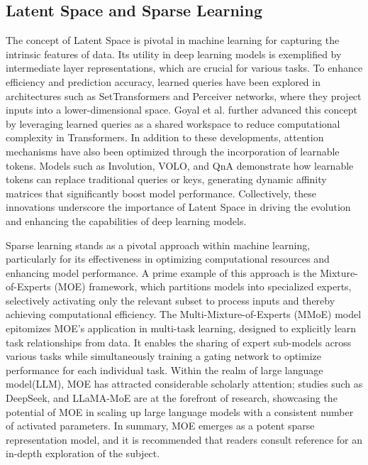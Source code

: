 \subsection{Latent Space and Sparse Learning}
The concept of Latent Space is pivotal in machine learning for capturing the intrinsic features of data. Its utility in deep learning models is exemplified by intermediate layer representations, which are crucial for various tasks\cite{goyal2021coordination}. To enhance efficiency and prediction accuracy, learned queries have been explored in architectures such as SetTransformers\cite{Settransformer} and Perceiver \cite{Perceiver} networks, where they project inputs into a lower-dimensional space. Goyal et al.\cite{goyal2021coordination} further advanced this concept by leveraging learned queries as a shared workspace to reduce computational complexity in Transformers. In addition to these developments, attention mechanisms have also been optimized through the incorporation of learnable tokens. Models such as Involution\cite{Involution}, VOLO\cite{Volo}, and QnA\cite{Learnedqueries} demonstrate how learnable tokens can replace traditional queries or keys, generating dynamic affinity matrices that significantly boost model performance. Collectively, these innovations underscore the importance of Latent Space in driving the evolution and enhancing the capabilities of deep learning models.

Sparse learning stands as a pivotal approach within machine learning, particularly for its effectiveness in optimizing computational resources and enhancing model performance. A prime example of this approach is the Mixture-of-Experts (MOE) framework, which partitions models into specialized experts, selectively activating only the relevant subset to process inputs and thereby achieving computational efficiency. The Multi-Mixture-of-Experts (MMoE)\cite{mmoe} model epitomizes MOE's application in multi-task learning, designed to explicitly learn task relationships from data. It enables the sharing of expert sub-models across various tasks while simultaneously training a gating network to optimize performance for each individual task. Within the realm of large language model(LLM), MOE has attracted considerable scholarly attention; studies such as DeepSeek\cite{deepseekv1}, and LLaMA-MoE\cite{LlamamoeV1,LlamamoeV2} are at the forefront of research, showcasing the potential of MOE in scaling up large language models  with a consistent number of activated parameters. In summary, MOE emerges as a potent sparse representation model, and it is recommended that readers consult reference \cite{moesurvey} for an in-depth exploration of the subject.
